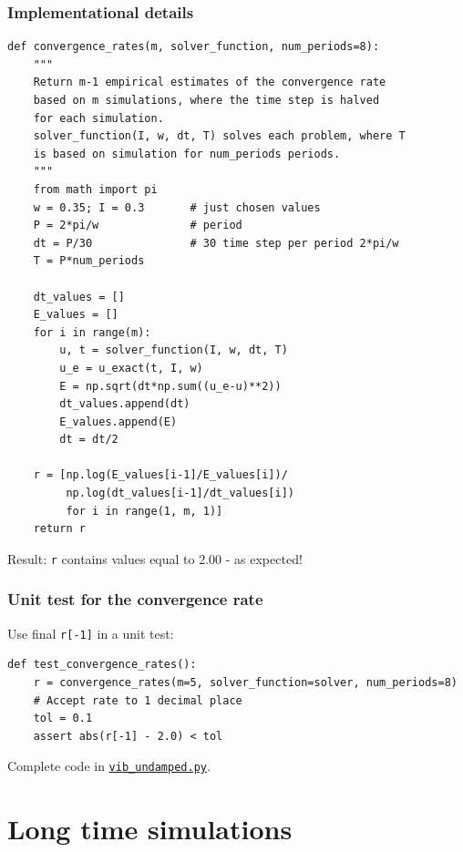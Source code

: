 \documentclass{beamer}
\begin{document}
\begin{frame}
\frametitle{Implementational details}

\begin{verbatim}
def convergence_rates(m, solver_function, num_periods=8):
    """
    Return m-1 empirical estimates of the convergence rate
    based on m simulations, where the time step is halved
    for each simulation.
    solver_function(I, w, dt, T) solves each problem, where T
    is based on simulation for num_periods periods.
    """
    from math import pi
    w = 0.35; I = 0.3       # just chosen values
    P = 2*pi/w              # period
    dt = P/30               # 30 time step per period 2*pi/w
    T = P*num_periods

    dt_values = []
    E_values = []
    for i in range(m):
        u, t = solver_function(I, w, dt, T)
        u_e = u_exact(t, I, w)
        E = np.sqrt(dt*np.sum((u_e-u)**2))
        dt_values.append(dt)
        E_values.append(E)
        dt = dt/2

    r = [np.log(E_values[i-1]/E_values[i])/
         np.log(dt_values[i-1]/dt_values[i])
         for i in range(1, m, 1)]
    return r
\end{verbatim}

Result: \texttt{r} contains values equal to 2.00 - as expected!
\end{frame}

\begin{frame}
\frametitle{Unit test for the convergence rate}

Use final \texttt{r[-1]} in a unit test:

\begin{verbatim}
def test_convergence_rates():
    r = convergence_rates(m=5, solver_function=solver, num_periods=8)
    # Accept rate to 1 decimal place
    tol = 0.1
    assert abs(r[-1] - 2.0) < tol
\end{verbatim}

Complete code in \href{{http://tinyurl.com/nm5587k/vib/vib_undamped.py}}{\nolinkurl{vib_undamped.py}}.
\end{frame}

\section{Long time simulations}
\label{vib:model1:longseries}
\end{document}
